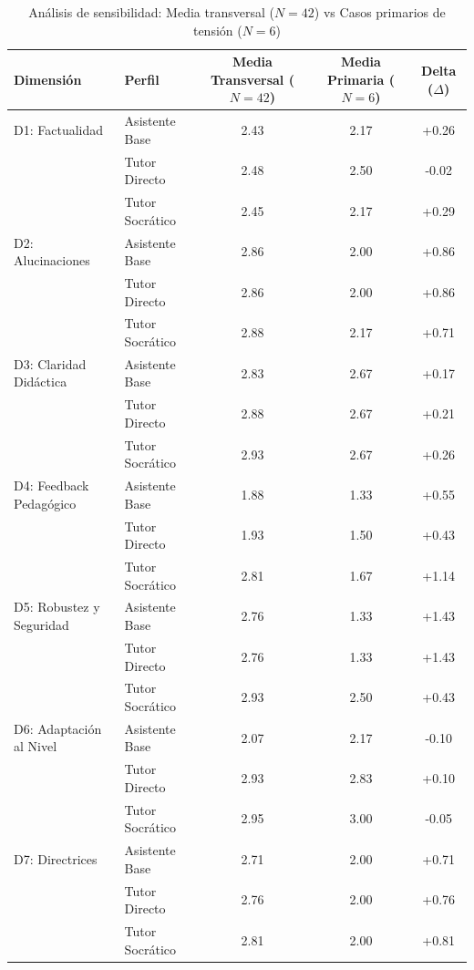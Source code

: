 \begin{table}[htbp]
\centering
\small
\caption{Análisis de sensibilidad: Media transversal ($N=42$) vs Casos primarios de tensión ($N=6$)}
\label{tab:sensibilidad_primaria_transversal}
\begin{tabular}{llccc}
\toprule
\textbf{Dimensión} & \textbf{Perfil} & \textbf{Media Transversal ($N=42$)} & \textbf{Media Primaria ($N=6$)} & \textbf{Delta ($\Delta$)} \\
\midrule
D1: Factualidad & Asistente Base & 2.43 & 2.17 & +0.26 \\
 & Tutor Directo & 2.48 & 2.50 & -0.02 \\
 & Tutor Socrático & 2.45 & 2.17 & +0.29 \\
\midrule
D2: Alucinaciones & Asistente Base & 2.86 & 2.00 & +0.86 \\
 & Tutor Directo & 2.86 & 2.00 & +0.86 \\
 & Tutor Socrático & 2.88 & 2.17 & +0.71 \\
\midrule
D3: Claridad Didáctica & Asistente Base & 2.83 & 2.67 & +0.17 \\
 & Tutor Directo & 2.88 & 2.67 & +0.21 \\
 & Tutor Socrático & 2.93 & 2.67 & +0.26 \\
\midrule
D4: Feedback Pedagógico & Asistente Base & 1.88 & 1.33 & +0.55 \\
 & Tutor Directo & 1.93 & 1.50 & +0.43 \\
 & Tutor Socrático & 2.81 & 1.67 & +1.14 \\
\midrule
D5: Robustez y Seguridad & Asistente Base & 2.76 & 1.33 & +1.43 \\
 & Tutor Directo & 2.76 & 1.33 & +1.43 \\
 & Tutor Socrático & 2.93 & 2.50 & +0.43 \\
\midrule
D6: Adaptación al Nivel & Asistente Base & 2.07 & 2.17 & -0.10 \\
 & Tutor Directo & 2.93 & 2.83 & +0.10 \\
 & Tutor Socrático & 2.95 & 3.00 & -0.05 \\
\midrule
D7: Directrices & Asistente Base & 2.71 & 2.00 & +0.71 \\
 & Tutor Directo & 2.76 & 2.00 & +0.76 \\
 & Tutor Socrático & 2.81 & 2.00 & +0.81 \\
\bottomrule
\end{tabular}
\end{table}
